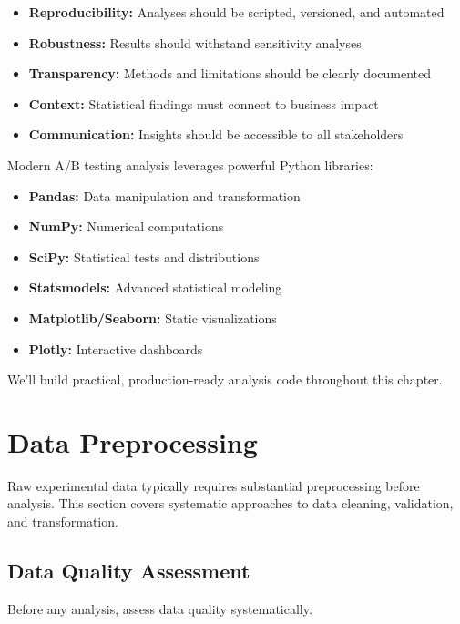 \begin{itemize}
    \item \textbf{Reproducibility:} Analyses should be scripted, versioned, and automated
    \item \textbf{Robustness:} Results should withstand sensitivity analyses
    \item \textbf{Transparency:} Methods and limitations should be clearly documented
    \item \textbf{Context:} Statistical findings must connect to business impact
    \item \textbf{Communication:} Insights should be accessible to all stakeholders
\end{itemize}

Modern A/B testing analysis leverages powerful Python libraries:
\begin{itemize}
    \item \textbf{Pandas:} Data manipulation and transformation
    \item \textbf{NumPy:} Numerical computations
    \item \textbf{SciPy:} Statistical tests and distributions
    \item \textbf{Statsmodels:} Advanced statistical modeling
    \item \textbf{Matplotlib/Seaborn:} Static visualizations
    \item \textbf{Plotly:} Interactive dashboards
\end{itemize}

We'll build practical, production-ready analysis code throughout this chapter.

\section{Data Preprocessing}

Raw experimental data typically requires substantial preprocessing before analysis. This section covers systematic approaches to data cleaning, validation, and transformation.

\subsection{Data Quality Assessment}

Before any analysis, assess data quality systematically.

